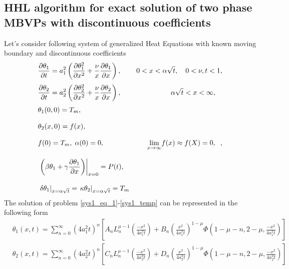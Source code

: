 \documentclass[review]{elsarticle}
\begin{document}
\subsection{HHL algorithm for exact solution of two phase MBVPs with discontinuous coefficients}
\label{sec:twophase}
Let's consider following system of generalized Heat Equations with known moving boundary and discontinuous coefficients
\begin{align}
&\frac{\partial {\theta_{1}}}{\partial {t}} = a_{1}^2\left(\frac{\partial {\theta_{1}^2}}{\partial {x^2}} + \frac{\nu}{x}\frac{\partial{\theta_{1}}}{\partial{x}} \right),\hspace{1em}  &0<x<\alpha \sqrt{t},\hspace{1em} 0<\nu, t<1, \label{sys1_eq_1}\\[1mm]
&\frac{\partial {\theta_{2}}}{\partial {t}} = a_{2}^2\left(\frac{\partial {\theta_{2}^2}}{\partial {x^2}} + \frac{\nu}{x}\frac{\partial{\theta_{2}}}{\partial{x}} \right),\hspace{1em}  &\alpha \sqrt{t}<x<\infty,\hspace{1em} \label{sys1_eq_2}\\[1mm]
&\theta_{1}(0,0) = T_{m},\label{sys1_incond1}\\[3mm]
&\theta_{2}(x,0) = f(x),\label{sys1_incond2}\\[3mm]
&f(0)=T_{m},\hspace{1mm}\alpha(0)=0,&\hspace{1mm}\underset{x\to \infty}{\lim}f(x)\approx f(X)=0,\hspace{1mm} \hspace{1mm},\label{sys1_concord}\\[3mm]
&\left. \left(\beta \theta_1+\gamma \frac{\partial \theta_1}{\partial x} \right)\right|_{x=0 } = P(t),\label{sys1_flux}\\[3mm]
&\left. \delta \theta_1\right|_{x=\alpha \sqrt{t} } = \left. \kappa \theta_2\right|_{x=\alpha \sqrt{t} }=T_{m}  \label{sys1_temp}
\end{align}
The solution of problem \ref{sys1_eq_1}-\ref{sys1_temp} can be represented in the following form
\begin{align}
&\theta_{1}(x,t)= \sum_{n=0}^{\infty}\left(4a_{1}^2t\right)^{n}\left[A_nL_{n}^{\mu-1}\left( \frac{-x^2}{4a_{1}^2t} \right)+ B_n\left( \frac{x^2}{4a_{1}^2t} \right)^{1-\mu}\Phi\left(1-\mu-n, 2-\mu,\frac{-x^2}{4a_{1}^2t}\right)\right] \label{sol1sys1}\\[1mm]
&\theta_{2}(x,t)= \sum_{n=0}^{\infty}\left(4a_{2}^2t\right)^{n}\left[C_nL_{n}^{\mu-1}\left( \frac{-x^2}{4a_{2}^2t} \right)+ D_n\left( \frac{x^2}{4a_{2}^2t} \right)^{1-\mu}\Phi\left(1-\mu-n, 2-\mu,\frac{-x^2}{4a_{2}^2t}\right)\right] \label{sol2sys1}
\end{align}
\end{document}
